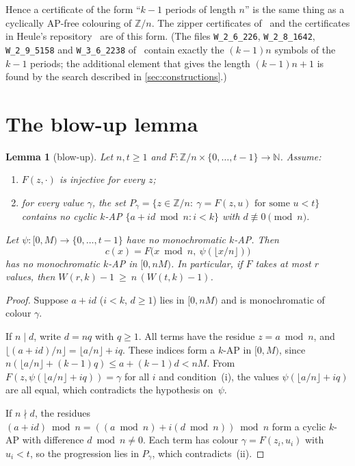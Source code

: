 \documentclass[11pt]{article}
\numberwithin{equation}{section}
\newtheorem{lemma}[theorem]{Lemma}
\theoremstyle{definition}
\theoremstyle{remark}
\newcommand{\Z}{\mathbb Z}
\newcommand{\N}{\mathbb N}
\newcommand{\W}{W}
\begin{document}
Hence a certificate of the form ``$k-1$ periods of length $n$'' is the same thing as a cyclically
AP-free colouring of $\Z/n$.  The zipper certificates of~\cite{HHLM07,RL12} and the certificates
in Heule's repository~\cite{HeuGit} are of this form.  (The files \texttt{W\_2\_6\_226},
\texttt{W\_2\_8\_1642}, \texttt{W\_2\_9\_5158} and \texttt{W\_3\_6\_2238} of~\cite{HeuGit} contain
exactly the $(k-1)n$ symbols of the $k-1$ periods; the additional element that gives the length
$(k-1)n+1$ is found by the search described in \cref{sec:constructions}.)

\section{The blow-up lemma}\label{sec:blowup}

\begin{lemma}[blow-up]\label{lem:blowup}
Let $n,t\ge1$ and $F:\Z/n\times\{0,\dots,t-1\}\to\N$.  Assume:
\begin{enumerate}
\item[(i)] $F(z,\cdot)$ is injective for every $z$;
\item[(ii)] for every value $\gamma$, the set
$P_\gamma=\{z\in\Z/n:\ \gamma=F(z,u)\text{ for some }u<t\}$ contains no cyclic $k$-AP
$\{a+id \bmod n: i<k\}$ with $d\not\equiv0\pmod n$.
\end{enumerate}
Let $\psi:[0,M)\to\{0,\dots,t-1\}$ have no monochromatic $k$-AP.  Then
\[ c(x)=F\bigl(x\bmod n,\ \psi(\lfloor x/n\rfloor)\bigr)\]
has no monochromatic $k$-AP in $[0,nM)$.  In particular, if $F$ takes at most $r$ values, then
$\W(r,k)-1\ \ge\ n\,(\W(t,k)-1)$.
\end{lemma}

\begin{proof}
Suppose $a+id$ ($i<k$, $d\ge1$) lies in $[0,nM)$ and is monochromatic of colour $\gamma$.

If $n\mid d$, write $d=nq$ with $q\ge1$.  All terms have the residue $z=a\bmod n$, and
$\lfloor(a+id)/n\rfloor=\lfloor a/n\rfloor+iq$.  These indices form a $k$-AP in $[0,M)$,
since $n(\lfloor a/n\rfloor+(k-1)q)\le a+(k-1)d<nM$.  From
$F(z,\psi(\lfloor a/n\rfloor+iq))=\gamma$ for all $i$ and condition~(i), the values
$\psi(\lfloor a/n\rfloor+iq)$ are all equal, which contradicts the hypothesis on~$\psi$.

If $n\nmid d$, the residues $(a+id)\bmod n=((a\bmod n)+i(d\bmod n))\bmod n$ form a cyclic
$k$-AP with difference $d\bmod n\neq0$.  Each term has colour $\gamma=F(z_i,u_i)$ with $u_i<t$,
so the progression lies in $P_\gamma$, which contradicts~(ii).
\end{proof}
\end{document}
